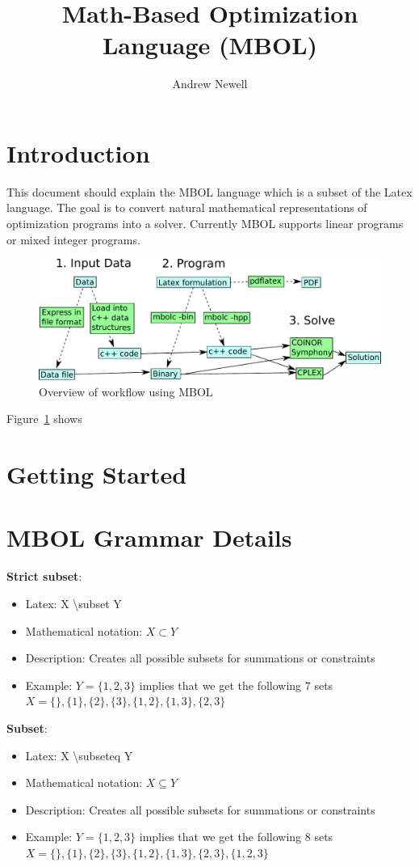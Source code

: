 \documentclass{article}
\newcommand{\mboldescrip}[5]{
\vspace{0.5in}
    \textbf{#1}:
    \begin{itemize}
        \item Latex: #2
        \item Mathematical notation: #3
        \item Description: #4
        \item Example: #5
    \end{itemize}
}
\begin{document}
\title{Math-Based Optimization Language (MBOL)}

\author{Andrew Newell}

\maketitle

\tableofcontents

\section{Introduction}

This document should explain the MBOL language which is a subset of the Latex language. The goal is to convert natural mathematical representations of optimization programs into a solver. Currently MBOL supports linear programs or mixed integer programs.

\begin{figure}
    \includegraphics[width=\textwidth]{figures/mbol-overview.pdf}
    \caption{Overview of workflow using MBOL}
    \label{lab:overview}
\end{figure}

Figure~\ref{lab:overview} shows 

\section{Getting Started}

\section{MBOL Grammar Details}

\mboldescrip{Strict subset}{X \textbackslash subset Y}{$X \subset Y$}{Creates all possible subsets for summations or constraints}{$Y=\{1,2,3\}$ implies that we get the following 7 sets $X=\{\},\{1\},\{2\},\{3\},\{1,2\},\{1,3\},\{2,3\}$}

\mboldescrip{Subset}{X \textbackslash subseteq Y}{$X \subseteq Y$}{Creates all possible subsets for summations or constraints}{$Y=\{1,2,3\}$ implies that we get the following 8 sets $X=\{\},\{1\},\{2\},\{3\},\{1,2\},\{1,3\},\{2,3\},\{1,2,3\}$}
\end{document}
